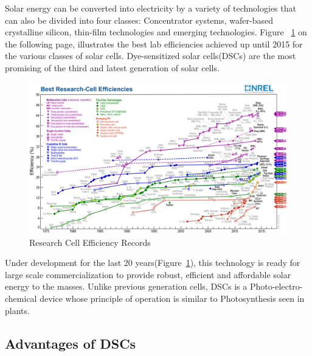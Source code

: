   Solar energy can be converted into electricity by a variety of technologies that can also be divided into four classes: Concentrator systems, wafer-based crystalline silicon, thin-film technologies and emerging technologies\cite{wenger2010strategies}. Figure ~\ref{fig:Cell_eficency} on the following page, illustrates the best lab efficiencies achieved up until 2015 for the various classes of solar cells. Dye-sensitized solar cells(\ac{DSCs}) are the most promising of the third and latest generation of solar cells.\\
  
    \begin{figure}[H]
    \begin{center}
    \includegraphics[width=1.6\linewidth, angle=90]{images/efficiency_chart.jpg}
    \caption{Research Cell Efficiency Records \cite{nrel_Research_Cell} }
    \label{fig:Cell_eficency}
    \end{center}
    \end{figure}
  
  Under development for the last 20 years(Figure~\ref{fig:Cell_eficency}), this technology is ready for large scale commercialization to provide robust, efficient and affordable solar energy to the masses. Unlike previous generation cells, \ac{DSCs} is a Photo-electro-chemical device whose principle of operation is similar to Photosynthesis seen in plants.\\

 \subsection{Advantages of DSCs }
  
